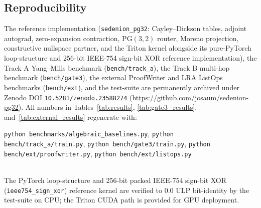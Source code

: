 \documentclass[11pt,a4paper]{article}
\theoremstyle{definition}
\theoremstyle{remark}
\newcommand{\PG}{\mathrm{PG}}
\begin{document}
\subsection{Reproducibility}
The reference implementation (\texttt{sedenion\_pg32}: Cayley--Dickson tables, adjoint autograd, zero-expansion contraction, $\PG(3,2)$ router, Moreno projection, constructive nullspace partner, and the Triton kernel alongside its pure-PyTorch loop-structure and 256-bit IEEE-754 sign-bit XOR reference implementation), the Track A Yang--Mills benchmark (\texttt{bench/track\_a}), the Track B multi-hop benchmark (\texttt{bench/gate3}), the external ProofWriter and LRA ListOps benchmarks (\texttt{bench/ext}), and the test-suite are permanently archived under Zenodo DOI \href{https://doi.org/10.5281/zenodo.23588274}{\texttt{10.5281/zenodo.23588274}} (\url{https://github.com/josaum/sedenion-pg32}). All numbers in Tables~\ref{tab:results}, \ref{tab:gate3_results}, and~\ref{tab:external_results} regenerate with:\\[2pt]\centerline{\texttt{python benchmarks/algebraic\_baselines.py}, \quad \texttt{python bench/track\_a/train.py}, \quad \texttt{python bench/gate3/train.py}, \quad \texttt{python bench/ext/proofwriter.py}, \quad \texttt{python bench/ext/listops.py}}\\[2pt] The PyTorch loop-structure and 256-bit packed IEEE-754 sign-bit XOR (\texttt{ieee754\_sign\_xor}) reference kernel are verified to $0.0\text{ ULP}$ bit-identity by the test-suite on CPU; the Triton CUDA path is provided for GPU deployment.
\end{document}
